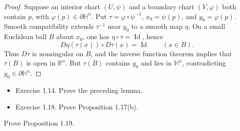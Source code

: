 \begin{proof}

\sketch Suppose an interior chart $(U,\psi)$ and a boundary chart
$(V,\varphi)$ both contain $p$, with $\varphi(p)\in\partial\mathbb H^n$. Put
$\tau=\varphi\circ\psi^{-1}$, $x_0=\psi(p)$, and $y_0=\varphi(p)$. Smooth
compatibility extends $\tau^{-1}$ near $y_0$ to a smooth map $\eta$. On a
small Euclidean ball $B$ about $x_0$, one has
$\eta\circ\tau=\operatorname{Id}$, hence
\[
D\eta(\tau(x))\circ D\tau(x)=\operatorname{Id}\qquad(x\in B).
\]
Thus $D\tau$ is nonsingular on $B$, and the inverse function theorem implies
that $\tau(B)$ is open in $\mathbb R^n$. But $\tau(B)$ contains $y_0$ and lies
in $\mathbb H^n$, contradicting $y_0\in\partial\mathbb H^n$.
\end{proof}

\begin{exercise}
\label{exer:1-14}


\begin{itemize}
\item Exercise 1.14. Prove the preceding lemma.
\end{itemize}
\end{exercise}

\begin{exercise}
\label{exer:1-18}


\begin{itemize}
\item Exercise 1.18. Prove Proposition 1.17(b).
\end{itemize}
\end{exercise}

\begin{exercise}
\label{exer:1-20}


Prove Proposition 1.19.
\end{exercise}
